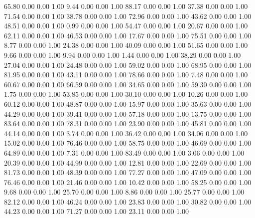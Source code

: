    65.80   0.00   0.00   1.00
    9.44   0.00   0.00   1.00
   88.17   0.00   0.00   1.00
   37.38   0.00   0.00   1.00
   71.54   0.00   0.00   1.00
   38.78   0.00   0.00   1.00
   72.96   0.00   0.00   1.00
   43.62   0.00   0.00   1.00
   48.51   0.00   0.00   1.00
    0.99   0.00   0.00   1.00
   54.47   0.00   0.00   1.00
   20.67   0.00   0.00   1.00
   62.11   0.00   0.00   1.00
   46.53   0.00   0.00   1.00
   17.67   0.00   0.00   1.00
   75.51   0.00   0.00   1.00
    8.77   0.00   0.00   1.00
   24.38   0.00   0.00   1.00
   40.09   0.00   0.00   1.00
   51.65   0.00   0.00   1.00
    9.66   0.00   0.00   1.00
    9.94   0.00   0.00   1.00
    1.44   0.00   0.00   1.00
   38.29   0.00   0.00   1.00
   27.04   0.00   0.00   1.00
   24.48   0.00   0.00   1.00
   59.02   0.00   0.00   1.00
   68.95   0.00   0.00   1.00
   81.95   0.00   0.00   1.00
   43.11   0.00   0.00   1.00
   78.66   0.00   0.00   1.00
    7.48   0.00   0.00   1.00
   60.67   0.00   0.00   1.00
   66.59   0.00   0.00   1.00
   34.65   0.00   0.00   1.00
   59.30   0.00   0.00   1.00
    1.75   0.00   0.00   1.00
   53.85   0.00   0.00   1.00
   30.10   0.00   0.00   1.00
   10.26   0.00   0.00   1.00
   60.12   0.00   0.00   1.00
   48.87   0.00   0.00   1.00
   15.97   0.00   0.00   1.00
   35.63   0.00   0.00   1.00
   44.29   0.00   0.00   1.00
   39.41   0.00   0.00   1.00
   57.18   0.00   0.00   1.00
   13.75   0.00   0.00   1.00
   83.64   0.00   0.00   1.00
   78.31   0.00   0.00   1.00
   23.90   0.00   0.00   1.00
   45.81   0.00   0.00   1.00
   44.14   0.00   0.00   1.00
    3.74   0.00   0.00   1.00
   36.42   0.00   0.00   1.00
   34.06   0.00   0.00   1.00
   15.02   0.00   0.00   1.00
   76.46   0.00   0.00   1.00
   58.75   0.00   0.00   1.00
   46.69   0.00   0.00   1.00
   64.89   0.00   0.00   1.00
    7.31   0.00   0.00   1.00
   83.49   0.00   0.00   1.00
    3.06   0.00   0.00   1.00
   20.39   0.00   0.00   1.00
   44.99   0.00   0.00   1.00
   12.81   0.00   0.00   1.00
   22.69   0.00   0.00   1.00
   81.73   0.00   0.00   1.00
   48.39   0.00   0.00   1.00
   77.27   0.00   0.00   1.00
   47.09   0.00   0.00   1.00
   76.46   0.00   0.00   1.00
   21.46   0.00   0.00   1.00
   10.42   0.00   0.00   1.00
   58.25   0.00   0.00   1.00
    9.68   0.00   0.00   1.00
   25.70   0.00   0.00   1.00
    8.86   0.00   0.00   1.00
   25.77   0.00   0.00   1.00
   82.12   0.00   0.00   1.00
   46.24   0.00   0.00   1.00
   23.83   0.00   0.00   1.00
   30.82   0.00   0.00   1.00
   44.23   0.00   0.00   1.00
   71.27   0.00   0.00   1.00
   23.11   0.00   0.00   1.00
